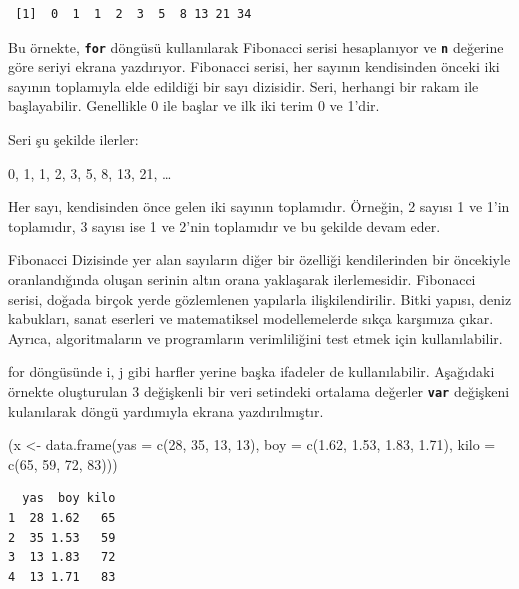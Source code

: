\documentclass[
  letterpaper,
  DIV=11,
  numbers=noendperiod]{scrreprt}
\newenvironment{Shaded}{\begin{snugshade}}{\end{snugshade}}
\newcommand{\AttributeTok}[1]{\textcolor[rgb]{0.40,0.45,0.13}{#1}}
\newcommand{\DecValTok}[1]{\textcolor[rgb]{0.68,0.00,0.00}{#1}}
\newcommand{\FloatTok}[1]{\textcolor[rgb]{0.68,0.00,0.00}{#1}}
\newcommand{\FunctionTok}[1]{\textcolor[rgb]{0.28,0.35,0.67}{#1}}
\newcommand{\NormalTok}[1]{\textcolor[rgb]{0.00,0.23,0.31}{#1}}
\newcommand{\OtherTok}[1]{\textcolor[rgb]{0.00,0.23,0.31}{#1}}
\begin{document}
\begin{verbatim}
 [1]  0  1  1  2  3  5  8 13 21 34
\end{verbatim}

Bu örnekte, \textbf{\texttt{for}} döngüsü kullanılarak Fibonacci serisi
hesaplanıyor ve \textbf{\texttt{n}} değerine göre seriyi ekrana
yazdırıyor. Fibonacci serisi, her sayının kendisinden önceki iki sayının
toplamıyla elde edildiği bir sayı dizisidir. Seri, herhangi bir rakam
ile başlayabilir. Genellikle 0 ile başlar ve ilk iki terim 0 ve 1'dir.

Seri şu şekilde ilerler:

0, 1, 1, 2, 3, 5, 8, 13, 21, \ldots{}

Her sayı, kendisinden önce gelen iki sayının toplamıdır. Örneğin, 2
sayısı 1 ve 1'in toplamıdır, 3 sayısı ise 1 ve 2'nin toplamıdır ve bu
şekilde devam eder.

Fibonacci Dizisinde yer alan sayıların diğer bir özelliği kendilerinden
bir öncekiyle oranlandığında oluşan serinin altın orana yaklaşarak
ilerlemesidir. Fibonacci serisi, doğada birçok yerde gözlemlenen
yapılarla ilişkilendirilir. Bitki yapısı, deniz kabukları, sanat
eserleri ve matematiksel modellemelerde sıkça karşımıza çıkar. Ayrıca,
algoritmaların ve programların verimliliğini test etmek için
kullanılabilir.

for döngüsünde i, j gibi harfler yerine başka ifadeler de
kullanılabilir. Aşağıdaki örnekte oluşturulan 3 değişkenli bir veri
setindeki ortalama değerler \textbf{\texttt{var}} değişkeni kulanılarak
döngü yardımıyla ekrana yazdırılmıştır.

\begin{Shaded}
\begin{Highlighting}[]
\NormalTok{(x }\OtherTok{\textless{}{-}} \FunctionTok{data.frame}\NormalTok{(}\AttributeTok{yas =} \FunctionTok{c}\NormalTok{(}\DecValTok{28}\NormalTok{, }\DecValTok{35}\NormalTok{, }\DecValTok{13}\NormalTok{, }\DecValTok{13}\NormalTok{),}
                \AttributeTok{boy =} \FunctionTok{c}\NormalTok{(}\FloatTok{1.62}\NormalTok{, }\FloatTok{1.53}\NormalTok{, }\FloatTok{1.83}\NormalTok{, }\FloatTok{1.71}\NormalTok{),}
                \AttributeTok{kilo =} \FunctionTok{c}\NormalTok{(}\DecValTok{65}\NormalTok{, }\DecValTok{59}\NormalTok{, }\DecValTok{72}\NormalTok{, }\DecValTok{83}\NormalTok{)))}
\end{Highlighting}
\end{Shaded}

\begin{verbatim}
  yas  boy kilo
1  28 1.62   65
2  35 1.53   59
3  13 1.83   72
4  13 1.71   83
\end{verbatim}
\end{document}
